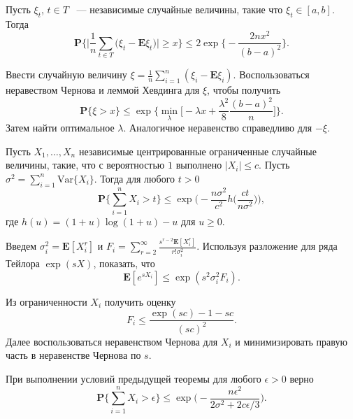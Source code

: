 \begin{problem} Пусть $\xi_t$, $t\in T$ ~--- независимые случайные величины, такие что $\xi_t\in[a,b]$. Тогда
\begin{equation*}
\mathbf{P}\bigg\{\bigg|\frac{1}{n}\sum_{t\in T}\big(\xi_t-\mathbf{E}\xi_t\bigr)\biggr|\geq x\biggr\}\leq 2\exp\bigg\{-\frac{2nx^2}{(b-a)^2}\biggr\}.
\end{equation*}
\end{problem}
\begin{remark}
Ввести случайную величину $\xi = \frac{1}{n}\sum_{i=1}^n(\xi_i-\mathbf{E}\xi_i)$.
Воспользоваться неравеством Чернова и леммой Хевдинга для $\xi$, чтобы получить
\begin{equation*}
\mathbf{P}\{\xi>x\}\leq \exp\bigg\{\min_{\lambda}\bigg[-\lambda x + \frac{\lambda^2}{8}\frac{(b-a)^2}{n}\biggr]\biggr\}.
\end{equation*}
Затем найти оптимальное $\lambda$.  Аналогичное неравенство справедливо для $-\xi$.
\end{remark}

\begin{problem}
Пусть $X_1,\dots, X_n$ независимые центрированные ограниченные случайные величины, такие, что с вероятностью $1$ выполнено $|X_i|\leq c$.
Пусть $\sigma^2 = \sum_{i=1}^n\text{Var}\{X_i\}$.
 Тогда для любого $t>0$ 
\begin{equation*}
\mathbf{P}\bigg\{\sum_{i=1}^n X_i>t\biggr\}\leq \exp\bigg(-\frac{n\sigma^2}{c^2}h\bigg(\frac{ct}{n\sigma^2}\biggr)\biggr),
\end{equation*}
где $h(u) = (1+u)\log(1+u)-u$ для $u\geq 0$.
\end{problem}
\begin{remark}
Введем $\sigma_i^2 = \mathbf{E}[X_i^r]$ и $F_i = \sum_{r=2}^{\infty}\frac{s^{r-2}\mathbf{E}[X_i^r]}{r!\sigma_i^2}$.
Используя разложение для ряда Тейлора $\exp(sX)$, показать, что 
\begin{equation*}
\mathbf{E}[e^{sX_i}]\leq \exp(s^2\sigma^2_iF_i).
\end{equation*}

Из ограниченности  $X_i$ получить оценку
\begin{equation*}
F_i\leq \frac{\exp(sc)-1-sc}{(sc)^2}.
\end{equation*} 
Далее воспользоваться неравенством Чернова для $X_i$ и минимизировать правую часть в неравенстве Чернова по $s$.
\end{remark}

\begin{problem}
При выполнении условий предыдущей теоремы для любого  $\epsilon>0$ верно 
\begin{equation*}
\mathbf{P}\bigg\{\sum_{i=1}^n X_i>\epsilon\biggr\}\leq \exp\bigg(-\frac{n\epsilon^2}{2\sigma^2+2c\epsilon/3}\biggr).
\end{equation*}
\end{problem}

